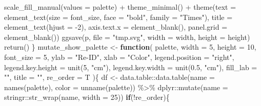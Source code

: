 \documentclass[
]{article}
\newenvironment{Shaded}{\begin{snugshade}}{\end{snugshade}}
\newcommand{\AttributeTok}[1]{\textcolor[rgb]{0.77,0.63,0.00}{#1}}
\newcommand{\ControlFlowTok}[1]{\textcolor[rgb]{0.13,0.29,0.53}{\textbf{#1}}}
\newcommand{\DecValTok}[1]{\textcolor[rgb]{0.00,0.00,0.81}{#1}}
\newcommand{\FloatTok}[1]{\textcolor[rgb]{0.00,0.00,0.81}{#1}}
\newcommand{\FunctionTok}[1]{\textcolor[rgb]{0.00,0.00,0.00}{#1}}
\newcommand{\NormalTok}[1]{#1}
\newcommand{\OtherTok}[1]{\textcolor[rgb]{0.56,0.35,0.01}{#1}}
\newcommand{\SpecialCharTok}[1]{\textcolor[rgb]{0.00,0.00,0.00}{#1}}
\newcommand{\StringTok}[1]{\textcolor[rgb]{0.31,0.60,0.02}{#1}}
\begin{document}
\begin{Shaded}
\begin{Highlighting}[]
      \FunctionTok{scale\_fill\_manual}\NormalTok{(}\AttributeTok{values =}\NormalTok{ palette) }\SpecialCharTok{+}
      \FunctionTok{theme\_minimal}\NormalTok{() }\SpecialCharTok{+}
      \FunctionTok{theme}\NormalTok{(}\AttributeTok{text =} \FunctionTok{element\_text}\NormalTok{(}\AttributeTok{size =}\NormalTok{ font\_size, }\AttributeTok{face =} \StringTok{"bold"}\NormalTok{, }\AttributeTok{family =} \StringTok{"Times"}\NormalTok{),}
            \AttributeTok{title =} \FunctionTok{element\_text}\NormalTok{(}\AttributeTok{hjust =} \SpecialCharTok{{-}}\DecValTok{2}\NormalTok{),}
            \AttributeTok{axis.text.x =} \FunctionTok{element\_blank}\NormalTok{(),}
            \AttributeTok{panel.grid =} \FunctionTok{element\_blank}\NormalTok{())}
    \FunctionTok{ggsave}\NormalTok{(p, }\AttributeTok{file =} \StringTok{"tmp.svg"}\NormalTok{, }\AttributeTok{width =}\NormalTok{ width, }\AttributeTok{height =}\NormalTok{ height)}
    \FunctionTok{return}\NormalTok{()}
\NormalTok{  \}}
\NormalTok{mutate\_show\_palette }\OtherTok{\textless{}{-}} 
  \ControlFlowTok{function}\NormalTok{(}
\NormalTok{           palette,}
           \AttributeTok{width =} \DecValTok{5}\NormalTok{,}
           \AttributeTok{height =} \DecValTok{10}\NormalTok{,}
           \AttributeTok{font\_size =} \DecValTok{5}\NormalTok{,}
           \AttributeTok{ylab =} \StringTok{"Re{-}ID"}\NormalTok{,}
           \AttributeTok{xlab =} \StringTok{"Color"}\NormalTok{,}
           \AttributeTok{legend.position =} \StringTok{"right"}\NormalTok{,}
           \AttributeTok{legend.key.height =} \FunctionTok{unit}\NormalTok{(}\DecValTok{5}\NormalTok{, }\StringTok{"cm"}\NormalTok{),}
           \AttributeTok{legend.key.width =} \FunctionTok{unit}\NormalTok{(}\FloatTok{0.5}\NormalTok{, }\StringTok{"cm"}\NormalTok{),}
           \AttributeTok{fill\_lab =} \StringTok{""}\NormalTok{,}
           \AttributeTok{title =} \StringTok{""}\NormalTok{,}
           \AttributeTok{re\_order =}\NormalTok{ T}
\NormalTok{           )\{}
\NormalTok{    df }\OtherTok{\textless{}{-}}\NormalTok{ data.table}\SpecialCharTok{::}\FunctionTok{data.table}\NormalTok{(}\AttributeTok{name =} \FunctionTok{names}\NormalTok{(palette), }\AttributeTok{color =} \FunctionTok{unname}\NormalTok{(palette)) }\SpecialCharTok{\%\textgreater{}\%} 
\NormalTok{      dplyr}\SpecialCharTok{::}\FunctionTok{mutate}\NormalTok{(}\AttributeTok{name =}\NormalTok{ stringr}\SpecialCharTok{::}\FunctionTok{str\_wrap}\NormalTok{(name, }\AttributeTok{width =} \DecValTok{25}\NormalTok{))}
    \ControlFlowTok{if}\NormalTok{(}\SpecialCharTok{!}\NormalTok{re\_order)\{}

\end{Highlighting}
\end{Shaded}
\end{document}
